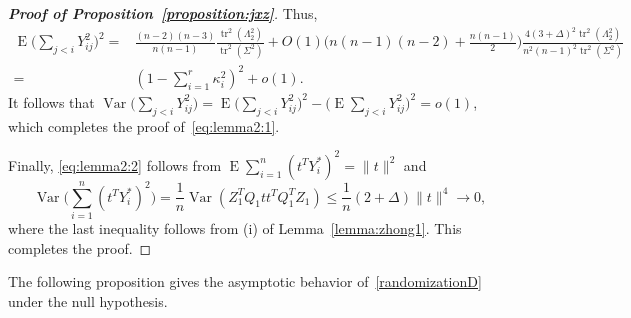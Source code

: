 \documentclass[3p]{elsarticle}
\DeclareMathOperator{\mytr}{tr}
\DeclareMathOperator{\myE}{E}
\DeclareMathOperator{\myVar}{Var}
\theoremstyle{plain}
\theoremstyle{definition}
\theoremstyle{remark}
\begin{document}
\begin{proof}[\textbf{Proof of Proposition~\ref{proposition:jxz}}]
    Thus,
    \begin{equation*}
    \begin{aligned}
        \myE\big(\sum_{j<i}Y_{ij}^2\big)^2
            =& \frac{(n-2)(n-3)}{n(n-1)}\frac{\mytr^2 (\Lambda_2^2)}{\mytr^2(\Sigma^2)}
            +
            O(1)\big(n(n-1)(n-2)+\frac{n(n-1)}{2}\big)\frac{4(3+\Delta)^2\mytr^2(\Lambda_2^2)}{n^2(n-1)^2\mytr^2(\Sigma^2)}\\
            =& (1-\sum_{i=1}^r \kappa_i^2)^2+o(1).
    \end{aligned}
    \end{equation*}
    It follows that
    $
    \myVar\big(\sum_{j<i}Y_{ij}^2\big)=
    \myE\big(\sum_{j<i}Y_{ij}^2\big)^2-
    \big(\myE\sum_{j<i}Y_{ij}^2\big)^2=o(1)
    $, which completes the proof of~\eqref{eq:lemma2:1}.


    Finally, \eqref{eq:lemma2:2} follows from
$
\myE \sum_{i=1}^n (t^T Y_i^{*})^2=\|t\|^2
$
and
$$
\myVar \big(\sum_{i=1}^n (t^T Y_i^{*})^2 \big)=\frac{1}{n}\myVar (Z_1^T Q_1 t t^T Q_1^T Z_1)
\leq \frac{1}{n}(2+\Delta)\|t\|^4\to 0,
$$
where the last inequality follows from (i) of Lemma~\ref{lemma:zhong1}.
This completes the proof.


\end{proof}



The following proposition gives the asymptotic behavior of~\eqref{randomizationD} under the null hypothesis.
\end{document}
